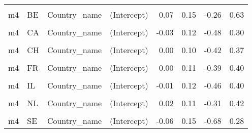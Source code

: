 \begin{table}
\begin{tabular}[t]{llllrrrr}
\cellcolor{gray!10}{m3.1} & \cellcolor{gray!10}{US} & \cellcolor{gray!10}{Country\_name} & \cellcolor{gray!10}{EPS} & \cellcolor{gray!10}{-0.01} & \cellcolor{gray!10}{0.06} & \cellcolor{gray!10}{-0.16} & \cellcolor{gray!10}{0.13}\\
m4 & BE & Country\_name & (Intercept) & 0.07 & 0.15 & -0.26 & 0.63\\
\cellcolor{gray!10}{m4} & \cellcolor{gray!10}{BE} & \cellcolor{gray!10}{Country\_name} & \cellcolor{gray!10}{EPS} & \cellcolor{gray!10}{0.14} & \cellcolor{gray!10}{0.07} & \cellcolor{gray!10}{-0.04} & \cellcolor{gray!10}{0.30}\\
m4 & CA & Country\_name & (Intercept) & -0.03 & 0.12 & -0.48 & 0.30\\
\cellcolor{gray!10}{m4} & \cellcolor{gray!10}{CA} & \cellcolor{gray!10}{Country\_name} & \cellcolor{gray!10}{EPS} & \cellcolor{gray!10}{-0.06} & \cellcolor{gray!10}{0.06} & \cellcolor{gray!10}{-0.21} & \cellcolor{gray!10}{0.08}\\
m4 & CH & Country\_name & (Intercept) & 0.00 & 0.10 & -0.42 & 0.37\\
\cellcolor{gray!10}{m4} & \cellcolor{gray!10}{CH} & \cellcolor{gray!10}{Country\_name} & \cellcolor{gray!10}{EPS} & \cellcolor{gray!10}{-0.01} & \cellcolor{gray!10}{0.06} & \cellcolor{gray!10}{-0.15} & \cellcolor{gray!10}{0.12}\\
m4 & FR & Country\_name & (Intercept) & 0.00 & 0.11 & -0.39 & 0.40\\
\cellcolor{gray!10}{m4} & \cellcolor{gray!10}{FR} & \cellcolor{gray!10}{Country\_name} & \cellcolor{gray!10}{EPS} & \cellcolor{gray!10}{0.00} & \cellcolor{gray!10}{0.06} & \cellcolor{gray!10}{-0.13} & \cellcolor{gray!10}{0.14}\\
m4 & IL & Country\_name & (Intercept) & -0.01 & 0.12 & -0.46 & 0.40\\
\cellcolor{gray!10}{m4} & \cellcolor{gray!10}{IL} & \cellcolor{gray!10}{Country\_name} & \cellcolor{gray!10}{EPS} & \cellcolor{gray!10}{-0.01} & \cellcolor{gray!10}{0.10} & \cellcolor{gray!10}{-0.27} & \cellcolor{gray!10}{0.25}\\
m4 & NL & Country\_name & (Intercept) & 0.02 & 0.11 & -0.31 & 0.42\\
\cellcolor{gray!10}{m4} & \cellcolor{gray!10}{NL} & \cellcolor{gray!10}{Country\_name} & \cellcolor{gray!10}{EPS} & \cellcolor{gray!10}{0.04} & \cellcolor{gray!10}{0.06} & \cellcolor{gray!10}{-0.10} & \cellcolor{gray!10}{0.17}\\
m4 & SE & Country\_name & (Intercept) & -0.06 & 0.15 & -0.68 & 0.28\\

\end{tabular}
\end{table}
